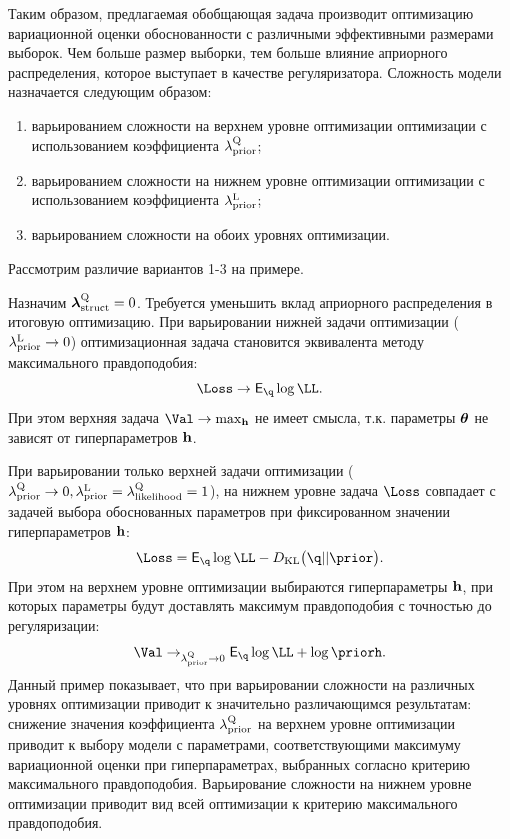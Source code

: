 Таким образом, предлагаемая обобщающая задача производит оптимизацию вариационной оценки обоснованности с различными  эффективными размерами выборок. Чем больше размер выборки, тем больше влияние априорного распределения, которое выступает в качестве регуляризатора. Сложность модели назначается следующим образом:
\begin{enumerate}
\item варьированием сложности на верхнем уровне оптимизации оптимизации с использованием коэффициента $\lambda_\text{prior}^\text{Q}$;
\item варьированием сложности на нижнем уровне оптимизации оптимизации с использованием коэффициента $\lambda_\text{prior}^\text{L}$;
\item варьированием сложности на обоих уровнях оптимизации.
\end{enumerate}
Рассмотрим различие вариантов 1-3 на примере.
\begin{example}
Назначим $\boldsymbol{\lambda}_\text{struct}^\text{Q} = 0$.
Требуется уменьшить вклад априорного распределения в итоговую оптимизацию.
При варьировании нижней задачи оптимизации ($\lambda_\text{prior}^\text{L} \to 0$) оптимизационная задача становится эквивалента методу максимального правдоподобия:
\[
   \Loss \to \E_{\q} \log \LL.
\]
При этом верхняя задача $\Val \to \max_{\h}$ не имеет смысла, т.к. параметры $\boldsymbol{\theta}$ не зависят от гиперпараметров $\mathbf{h}$.

При варьировании только верхней задачи оптимизации ($\lambda_\text{prior}^\text{Q} \to 0, \lambda_\text{prior}^\text{L} = \lambda_\text{likelihood}^\text{Q} = 1$), на нижнем уровне задача $\Loss$ совпадает с задачей выбора обоснованных параметров при фиксированном значении гиперпараметров $\mathbf{h}$:
\[
   \Loss = \E_{\q} \log \LL - \KL{\q}{\prior}.
\]
При этом на верхнем уровне оптимизации выбираются гиперпараметры $\mathbf{h}$, при которых параметры будут доставлять максимум правдоподобия с точностью до регуляризации:
\[
    \Val \to_{\lamCQ \to 0} \E_{\q} \log \LL  + \log \priorh.
\]
Данный пример показывает, что при варьировании  сложности на различных уровнях оптимизации приводит к значительно различающимся результатам: снижение значения коэффициента $\lambda_\text{prior}^\text{Q}$ на верхнем уровне оптимизации приводит к выбору модели с параметрами, соответствующими максимуму вариационной оценки при гиперпараметрах, выбранных согласно критерию максимального правдоподобия. Варьирование сложности на нижнем уровне оптимизации приводит вид всей оптимизации к критерию максимального правдоподобия. 
\end{example}

